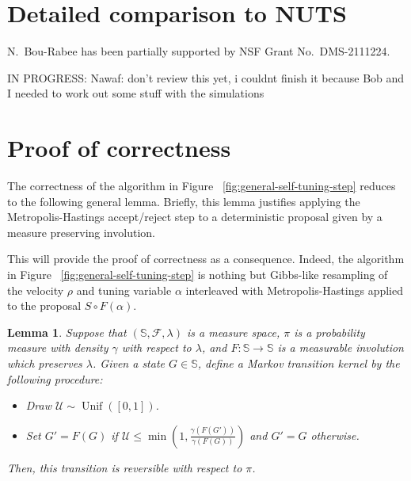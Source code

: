 \documentclass[ejs]{imsart}
\theoremstyle{plain}%
\newtheorem{lemma}[prototheorem]{Lemma}
\theoremstyle{remark}
\begin{document}
\section{Detailed comparison to NUTS}

\begin{funding}
N.~Bou-Rabee has been partially supported by NSF Grant No.~DMS-2111224.
\end{funding}

\printbibliography

\appendix
{ \color{magenta}

IN PROGRESS: Nawaf: don't review this yet, i couldnt  finish it because Bob and I needed to work out some stuff with the simulations

\section{Proof of correctness}

The correctness of the algorithm in Figure ~\ref{fig:general-self-tuning-step} reduces to the following general lemma. Briefly, this lemma justifies applying the Metropolis-Hastings accept/reject step to a deterministic proposal given by a measure preserving involution. 

This will provide the proof of correctness as a consequence. Indeed, the algorithm in Figure ~\ref{fig:general-self-tuning-step} is nothing but Gibbs-like resampling of the velocity $\rho$ and tuning variable $\alpha$ interleaved with Metropolis-Hastings applied to the proposal $S \circ F(\alpha)$. 

\begin{lemma} \label{lem:DeterministicMetropolization}    
Suppose that $(\mathbb{S}, \mathcal{F}, \lambda)$ is a measure space, $\pi$ is a probability measure with density $ \gamma$ with respect to $\lambda$, and $F: \mathbb{S}\to \mathbb{S}$ is a measurable involution which preserves $\lambda$. Given a state $G \in \mathbb{S}$, define a Markov transition kernel by the following procedure:
\begin{itemize}
    \item Draw $\mathcal{U} \sim \operatorname{Unif}([0,1])$.
    \item Set $G' = F(G)$ if  $\mathcal{U} \le \min\left(1, \frac{\gamma(F(G'))}{\gamma(F(G))} \right)$ and $G' = G$ otherwise.
\end{itemize}
Then, this transition is reversible with respect to $\pi$.
\end{lemma}


}
\end{document}
